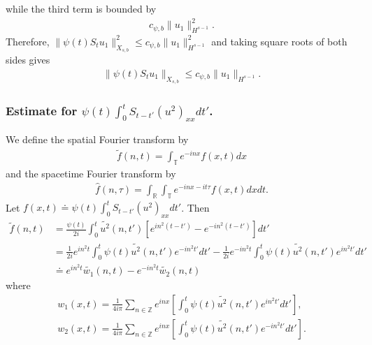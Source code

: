 \documentclass[12pt,reqno]{amsart}
\numberwithin{equation}{section}  %
\numberwithin{figure}{section}
\newcommand{\rr}{\mathbb{R}}
\newcommand{\zz}{\mathbb{Z}}
\newcommand{\ci}{\mathbb{T}}
\newcommand{\wh}{\widehat}
\newcommand{\wt}{\widetilde}
\theoremstyle{plain}
\theoremstyle{definition}
\theoremstyle{remark}
\begin{document}
while the third term is bounded by  
%
%
\begin{equation*}
\begin{split}
  c_{\psi, b} \| u_{1} \|_{H^{s-1}}^{2}.
\end{split}
\end{equation*}
%
%
Therefore, 
$\|\psi(t) S_{t} u_{1}\|_{X_{s,b}}^{2} \le c_{\psi, b}
\|u_{1}\|_{H^{s-1}}^2$ and
taking square roots of both sides gives
%
%
\begin{equation}
  \begin{split}
    \|\psi(t) S_{t} u_{1}\|_{X_{s,b}} \le c_{\psi, b}
    \|u_{1}\|_{H^{s-1}}.
  \end{split}
  \label{eqn:u-1-fin-est}
\end{equation}

\subsubsection{Estimate for $\psi(t) \int_{0}^{t} S_{t-t'} (u^{2})_{xx} dt'$.}
\label{sssec:non-lin-term}
We define the spatial Fourier transform by 
%
%
\begin{equation*}
\begin{split}
  \tilde{f}(n, t) = \int_{\ci} e^{-inx}f(x,t) dx
\end{split}
\end{equation*}
%
%
and the spacetime Fourier transform by
\begin{equation*}
\begin{split}
  \wh{f}(n, \tau) = \int_{\rr} \int_{\ci} e^{-inx-it\tau}f(x,t) dx dt.
\end{split}
\end{equation*}
%
%
Let $f(x,t) \doteq \psi(t) \int_{0}^{t} S_{t-t'} (u^{2})_{xx} dt'$. 
Then
%
%
\begin{equation}
  \begin{split}
    \wt{f}(n, t)
    & = \frac{\psi(t)}{2i} \int_{0}^{t}\wt{u^{2}}(n, t') \left[
    e^{in^{2}(t-t')} - e^{-in^{2}(t-t')}
    \right] dt'
    \\
    & = \frac{1}{2i} e^{in^{2}t} \int_{0}^{t} \psi(t) \wt{u^{2}}(n, t') e^{-in^{2}t'}
    dt' - 
    \frac{1}{2i} e^{-in^{2}t} \int_{0}^{t} \psi(t) \wt{u^{2}}(n, t') e^{in^{2}t'} dt'
    \\
    & \doteq e^{in^{2}t} \wt{w_1}(n, t) - e^{-in^{2}t} \wt{w_2}(n, t)
  \end{split}
  \label{space-four-trans}
\end{equation}
%
where
%
%
\begin{gather*}
  w_{1}(x,t) = \frac{1}{4 i \pi} \sum_{n \in \zz} e^{inx} \left[ \int_{0}^{t} \psi(t) \wt{u^{2}}(n, t') e^{in^{2}t'}
  dt'\right],
  \\
  w_{2}(x,t) = \frac{1}{4 i\pi} \sum_{n \in \zz} e^{inx} \left[ \int_{0}^{t} \psi(t) \wt{u^{2}}(n, t') e^{-in^{2}t'} dt'
 \right].
\end{gather*}
\end{document}
